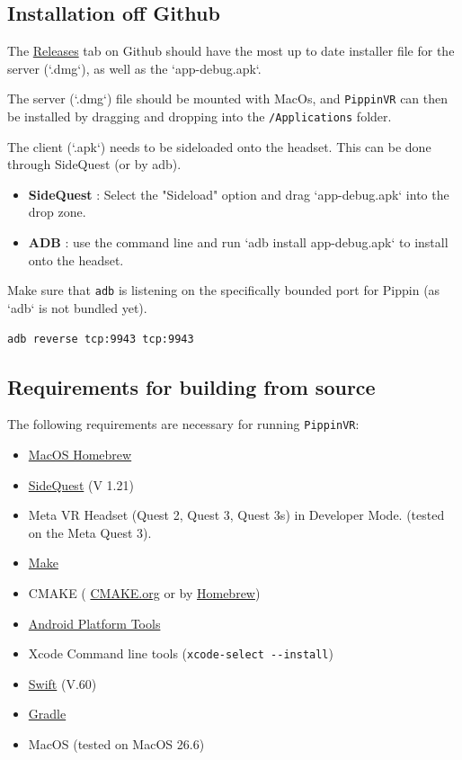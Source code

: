 \documentclass[11pt]{article}
\begin{document}
\subsection{Installation off Github}
\label{sec:org0ce0959}
The \href{https://github.com/triscuitcircuit/PippinVR/releases}{Releases} tab on Github should have the most up to date installer file for the server (`.dmg`), as well as the `app-debug.apk`.

The server (`.dmg`) file should be mounted with MacOs, and \texttt{PippinVR} can then be installed by dragging and dropping into the \texttt{/Applications} folder.

The client (`.apk`) needs to be sideloaded onto the headset. This can be done through SideQuest (or by adb).
\begin{itemize}
\item \textbf{SideQuest} : Select the "Sideload" option and drag `app-debug.apk` into the drop zone.
\item \textbf{ADB} : use the command line and run `adb install app-debug.apk` to install onto the headset.
\end{itemize}

Make sure that \texttt{adb} is listening on the specifically bounded port for Pippin (as `adb` is not bundled yet).
\begin{verbatim}
adb reverse tcp:9943 tcp:9943
\end{verbatim}
\subsection{Requirements for building from source}
\label{sec:orgb948b55}
The following requirements are necessary for running \texttt{PippinVR}:
\begin{itemize}
\item \href{https://brew.sh/}{MacOS Homebrew}
\item \href{https://sidequestvr.com/setup-howto}{SideQuest} (V 1.21)
\item Meta VR Headset (Quest 2, Quest 3, Quest 3s) in Developer Mode. (tested on the Meta Quest 3).
\item \href{https://formulae.brew.sh/formula/make\#default}{Make}
\item CMAKE ( \href{https://cmake.org/}{CMAKE.org} or by \href{https://formulae.brew.sh/formula/cmake}{Homebrew})
\item \href{https://formulae.brew.sh/cask/android-platform-tools\#default}{Android Platform Tools}
\item Xcode Command line tools (\texttt{xcode-select -{}-{}install})
\item \href{https://developer.apple.com/swift/}{Swift} (V.60)
\item \href{https://formulae.brew.sh/formula/gradle}{Gradle}
\item MacOS (tested on MacOS 26.6)
\end{itemize}
\end{document}
